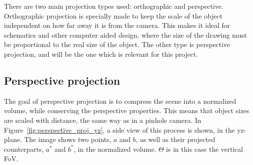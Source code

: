 There are two main projection types used: orthographic and perspective. Orthographic projection is specially made to keep the scale of the object independent on how far away it is from the camera. This makes it ideal for schematics and other computer aided design, where the size of the drawing must be proportional to the real size of the object. The other type is perspective projection, and will be the one which is relevant for this project.

\subsection{Perspective projection}

The goal of perspective projection is to compress the scene into a normalized volume, while conserving the perspective properties. This means that object sizes are scaled with distance, the same way as in a pinhole camera. In Figure~\ref{fig:perspective_proj_yz}, a side view of this process is shown, in the yz-plane. The image shows two points, $a$ and $b$, as well as their projected counterparts, $a^*$ and $b^*$, in the normalized volume. $\Theta$ is in this case the vertical FoV.

